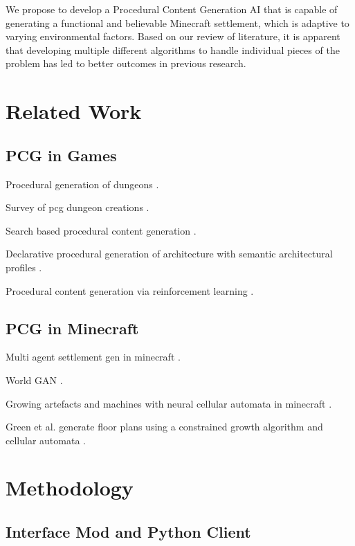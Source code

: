 \documentclass[11pt, oneside]{article}
\begin{document}
\begin{normalsize}
We propose to develop a Procedural Content Generation AI that is capable of generating a functional and believable Minecraft settlement, which is adaptive to varying environmental factors. Based on our review of literature, it is apparent that developing multiple different algorithms to handle individual pieces of the problem has led to better outcomes in previous research. 


\section{Related Work}
\label{Related Work}

\subsection{PCG in Games}

Procedural generation of dungeons \cite{van2013procedural}.

Survey of pcg dungeon creations \cite{viana2019survey}.

Search based procedural content generation \cite{togelius2011search}.

Declarative procedural generation of architecture with semantic architectural profiles \cite{van2020declarative}.

Procedural content generation via reinforcement learning \cite{khalifa2020pcgrl}.


\subsection{PCG in Minecraft}

Multi agent settlement gen in minecraft \cite{esko2021multi}.

World GAN \cite{awiszus2021world}.

Growing artefacts and machines with neural cellular automata in minecraft \cite{sudhakaran2021growing}.

Green et al. generate floor plans using a constrained growth algorithm and cellular automata \cite{green_organic_2019}.

\section{Methodology}
\label{Methodology}

\subsection{Interface Mod and Python Client}


\end{normalsize}
\end{document}
